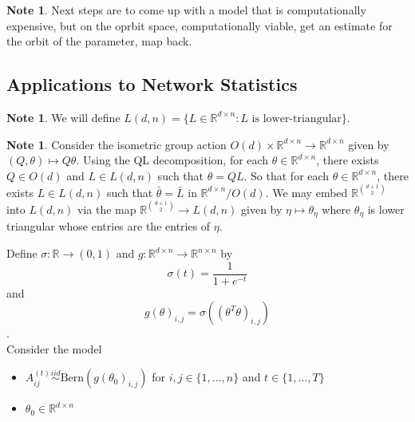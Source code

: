 \documentclass[12pt]{amsart}
\theoremstyle{definition}
\newtheorem{note}[definition]{Note}
\newcommand{\sig}{\sigma}
\newcommand{\R}{\mathbb{R}}
\begin{document}
	
	\begin{note}
	Next steps are to come up with a model that is computationally expensive, but on the oprbit space, computationally viable, get an estimate for the orbit of the parameter, map back.
	\end{note}
	
	
	
	
	
	
	
	
	
	
	
	
	
	
	
	\newpage
	\subsection{Applications to Network Statistics}
	
	\begin{note}
	We will define $L(d,n) = \{L \in \R^{d \times n}: L \text{ is lower-triangular}\}$.
	\end{note}
	
	\begin{note}
	Consider the isometric group action $O(d) \times \R^{d \times n} \rightarrow \R^{d \times n}$ given by $(Q, \theta) \mapsto Q \theta$. Using the QL decomposition, for each $\theta \in \R^{d \times n}$, there exists $Q \in O(d)$ and  $L \in L(d,n)$ such that $\theta = QL$. So that for each $\theta \in \R^{d \times n}$, there exists $L \in L(d,n)$ such that $\bar{\theta} = \bar{L}$ in $\R^{d \times n} / O(d)$. We may embed $\R^{{d+1 \choose 2}}$ into $L(d,n)$ via the map $\R^{{d+1 \choose 2}} \rightarrow L(d,n)$ given by $\eta \mapsto \theta_{\eta}$ where $\theta_{\eta}$ is lower triangular whose entries are the entries of $\eta$. 
	\end{note} 
	
	Define $\sig: \R \rightarrow (0,1)$ and $g:\R^{d \times n} \rightarrow \R^{n \times n}$ by $$\sig(t) = \frac{1}{1+ e^{-t}}$$ and $$g(\theta)_{i,j} = \sig((\theta^T \theta)_{i,j})$$.\\
	
	Consider the model 
	\begin{itemize}
	\item $A_{ij}^{(t)} \overset{iid}{\sim} \text{Bern}(g(\theta_0)_{i,j})$ for $i,j \in \{1, \ldots, n\}$ and $t \in \{1, \ldots, T\}$
	\item $\theta_0 \in \R^{d \times n}$
	\end{itemize}
	
\end{document}
